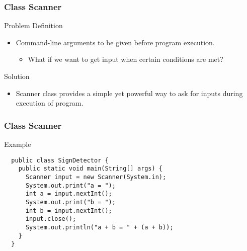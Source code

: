 \documentclass[10pt, compress]{beamer}
\begin{document}
\begin{frame}[fragile]
  \frametitle{Class Scanner}
  \begin{block}{Problem Definition}
    \begin{itemize}
      \item[] Command-line arguments to be given before program execution.
        \begin{itemize}
          \item[] What if we want to get input when certain conditions are met?
        \end{itemize}
    \end{itemize}
  \end{block}
  \begin{block}{Solution}
    \begin{itemize}
      \item[] Scanner class provides a simple yet powerful way to ask for inputs during execution of program.
    \end{itemize}
  \end{block}
\end{frame}

\begin{frame}[fragile]
  \frametitle{Class Scanner}
  \begin{block}{Example}
    \begin{verbatim}
  public class SignDetector {
    public static void main(String[] args) {
      Scanner input = new Scanner(System.in);
      System.out.print("a = ");
      int a = input.nextInt();
      System.out.print("b = ");
      int b = input.nextInt();
      input.close();
      System.out.println("a + b = " + (a + b));
    }
  }
    \end{verbatim}
  \end{block}
\end{frame}
\end{document}

